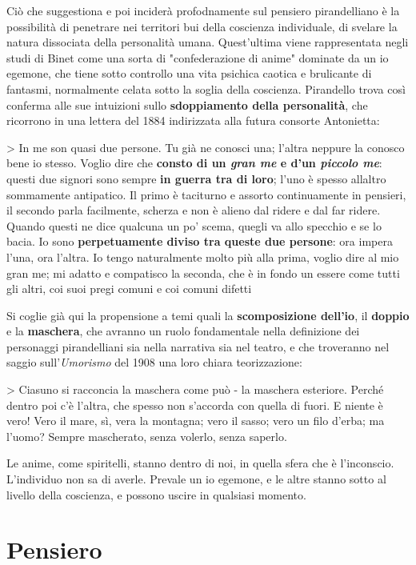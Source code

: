 Ciò che suggestiona e poi inciderà profodnamente sul pensiero pirandelliano è la possibilità di penetrare nei territori bui della coscienza individuale, di svelare la natura dissociata della personalità umana. Quest'ultima viene rappresentata negli studi di Binet come una sorta di "confederazione di anime" dominate da un io egemone, che tiene sotto controllo una vita psichica caotica e brulicante di fantasmi, normalmente celata sotto la soglia della coscienza. Pirandello trova così conferma alle sue intuizioni sullo \textbf{sdoppiamento della personalità}, che ricorrono in una lettera del 1884 indirizzata alla futura consorte Antonietta:

> In me son quasi due persone. Tu già ne conosci una; l'altra neppure la conosco bene io stesso. Voglio dire che \textbf{consto di un \textit{gran me} e d'un \textit{piccolo me}}: questi due signori sono sempre \textbf{in guerra tra di loro}; l'uno è spesso allaltro sommamente antipatico. Il primo è taciturno e assorto continuamente in pensieri, il secondo parla facilmente, scherza e non è alieno dal ridere e dal far ridere. Quando questi ne dice qualcuna un po' scema, quegli va allo specchio e se lo bacia. Io sono \textbf{perpetuamente diviso tra queste due persone}: ora impera l'una, ora l'altra. Io tengo naturalmente molto più alla prima, voglio dire al mio gran me; mi adatto e compatisco la seconda, che è in fondo un essere come tutti gli altri, coi suoi pregi comuni e coi comuni difetti

Si coglie già qui la propensione a temi quali la \textbf{scomposizione dell'io}, il \textbf{doppio} e la \textbf{maschera}, che avranno un ruolo fondamentale nella definizione dei personaggi pirandelliani sia nella narrativa sia nel teatro, e che troveranno nel saggio sull'\textit{Umorismo} del 1908 una loro chiara teorizzazione:

> Ciasuno si racconcia la maschera come può - la maschera esteriore. Perché dentro poi c'è l'altra, che spesso non s'accorda con quella di fuori. E niente è vero! Vero il mare, sì, vera la montagna; vero il sasso; vero un filo d'erba; ma l'uomo? Sempre mascherato, senza volerlo, senza saperlo.

Le anime, come spiritelli, stanno dentro di noi, in quella sfera che è l'inconscio. L'individuo non sa di averle. Prevale un io egemone, e le altre stanno sotto al livello della coscienza, e possono uscire in qualsiasi momento.

\section{Pensiero}

